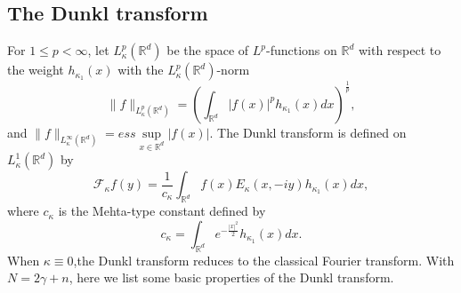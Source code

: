 \documentclass[a4paper,11pt, reqno]{amsart}
\theoremstyle{definition}
\theoremstyle{remark}
\numberwithin{equation}{section}
\begin{document}
	\subsection{The Dunkl transform} \label{Dunkl transform}
	For $1\leq p<\infty$, let $L_\kappa^p\left(\mathbb{R}^{d}\right)$ be the space of $L^p$-functions on $\mathbb{R}^{d}$ with respect to the weight $h_{\kappa_1}(x)$ with the $L_\kappa^p\left(\mathbb{R}^{d}\right)$-norm
	\begin{equation*}
		\|f\|_{L_\kappa^p\left(\mathbb{R}^{d}\right)}=\left(\int_{\mathbb{R}^{d}}|f(x)|^ph_{\kappa_1}(x)dx\right)^\frac{1}{p},
	\end{equation*}
	and $\|f\|_{L_\kappa^\infty\left(\mathbb{R}^{d}\right)}=ess \sup\limits_{x\in\mathbb{R}^{d}}|f(x)|$.
	The Dunkl transform is defined on $L_\kappa^1\left(\mathbb{R}^{d}\right)$ by
	\begin{equation}\label{Dunkltransform}
		\mathcal{F}_\kappa f(y)=\frac{1}{c_\kappa}\int_{\mathbb{R}^{d}} f(x) E_\kappa(x,-iy)h_{\kappa_1}(x)dx,
	\end{equation}
	where $c_\kappa$ is the Mehta-type constant defined by
	\begin{equation*}
		c_\kappa=\int_{\mathbb{R}^{d}} e^{-\frac{|x|^2}{2}}h_{\kappa_1}(x)dx.
	\end{equation*}
	When $\kappa \equiv 0$,the Dunkl transform reduces to the classical Fourier transform.  With $N=2\gamma+n$, here we list some basic properties of the Dunkl transform.
\end{document}
